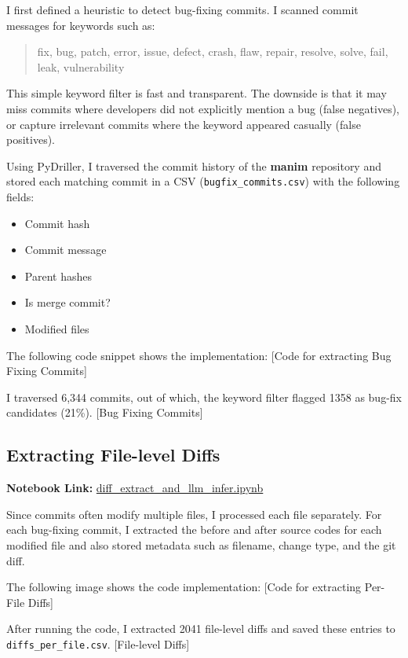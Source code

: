 \documentclass[10pt,a4paper]{report}
\begin{document}
I first defined a heuristic to detect bug-fixing commits. I scanned commit messages for keywords such as:
\begin{quote}
fix, bug, patch, error, issue, defect, crash, flaw, repair, resolve, solve, fail, leak, vulnerability
\end{quote}

This simple keyword filter is fast and transparent. The downside is that it may miss commits where developers did not explicitly mention a bug (false negatives), or capture irrelevant commits where the keyword appeared casually (false positives).

Using PyDriller, I traversed the commit history of the \textbf{manim} repository and stored each matching commit in a CSV (\texttt{bugfix\_commits.csv}) with the following fields:
\begin{itemize}[itemsep=0.05em, topsep=0pt]
    \item Commit hash
    \item Commit message
    \item Parent hashes
    \item Is merge commit?
    \item Modified files
\end{itemize}

The following code snippet shows the implementation:
[Code for extracting Bug Fixing Commits]

I traversed 6,344 commits, out of which, the keyword filter flagged 1358 as bug-fix candidates (21\%).
[Bug Fixing Commits]

\subsection{Extracting File-level Diffs}
\textbf{Notebook Link:} \href{https://github.com/ShardulJunagade/cs202-stt/blob/main/lab2/diff_extract_and_llm_infer.ipynb}{diff\_extract\_and\_llm\_infer.ipynb}

Since commits often modify multiple files, I processed each file separately. For each bug-fixing commit, I extracted the before and after source codes for each modified file and also stored metadata such as filename, change type, and the git diff.

The following image shows the code implementation:
[Code for extracting Per-File Diffs]

After running the code, I extracted 2041 file-level diffs and saved these entries to \texttt{diffs\_per\_file.csv}.
[File-level Diffs]
\end{document}
